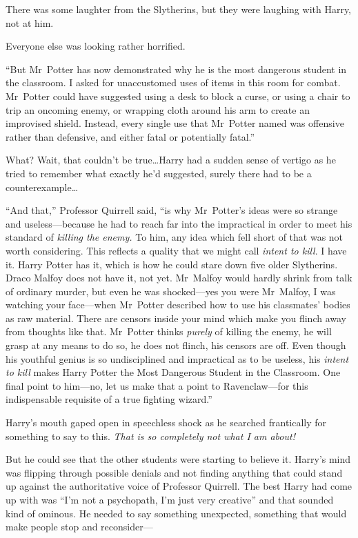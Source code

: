 There was some laughter from the Slytherins, but they were laughing with Harry, not at him.

Everyone else was looking rather horrified.

“But Mr~Potter has now demonstrated why he is the most dangerous student in the classroom. I asked for unaccustomed uses of items in this room for combat. Mr~Potter could have suggested using a desk to block a curse, or using a chair to trip an oncoming enemy, or wrapping cloth around his arm to create an improvised shield. Instead, every single use that Mr~Potter named was offensive rather than defensive, and either fatal or potentially fatal.”

What? Wait, that couldn’t be true…Harry had a sudden sense of vertigo as he tried to remember what exactly he’d suggested, surely there had to be a counterexample…

“And that,” Professor Quirrell said, “is why Mr~Potter’s ideas were so strange and useless—because he had to reach far into the impractical in order to meet his standard of \emph{killing the enemy.} To him, any idea which fell short of that was not worth considering. This reflects a quality that we might call \emph{intent to kill}. I have it. Harry Potter has it, which is how he could stare down five older Slytherins. Draco Malfoy does not have it, not yet. Mr~Malfoy would hardly shrink from talk of ordinary murder, but even he was shocked—yes you were Mr~Malfoy, I was watching your face—when Mr~Potter described how to use his classmates’ bodies as raw material. There are censors inside your mind which make you flinch away from thoughts like that. Mr~Potter thinks \emph{purely} of killing the enemy, he will grasp at any means to do so, he does not flinch, his censors are off. Even though his youthful genius is so undisciplined and impractical as to be useless, his \emph{intent to kill} makes Harry Potter the Most Dangerous Student in the Classroom. One final point to him—no, let us make that a point to Ravenclaw—for this indispensable requisite of a true fighting wizard.”

Harry’s mouth gaped open in speechless shock as he searched frantically for something to say to this. \emph{That is so completely not what I am about!}

But he could see that the other students were starting to believe it. Harry’s mind was flipping through possible denials and not finding anything that could stand up against the authoritative voice of Professor Quirrell. The best Harry had come up with was “I’m not a psychopath, I’m just very creative” and that sounded kind of ominous. He needed to say something unexpected, something that would make people stop and reconsider—

